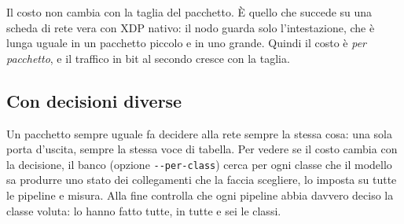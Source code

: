 \documentclass[11pt,a4paper,oneside]{report}
\begin{document}
\begin{center}
\end{center}

Il costo non cambia con la taglia del pacchetto. È quello che succede su una
scheda di rete vera con XDP nativo: il nodo guarda solo l'intestazione, che è
lunga uguale in un pacchetto piccolo e in uno grande. Quindi il costo è
\emph{per pacchetto}, e il traffico in bit al secondo cresce con la taglia.

\subsection*{Con decisioni diverse}

Un pacchetto sempre uguale fa decidere alla rete sempre la stessa cosa: una sola
porta d'uscita, sempre la stessa voce di tabella. Per vedere se il costo cambia
con la decisione, il banco (opzione \texttt{-{}-per-class}) cerca per ogni classe
che il modello sa produrre uno stato dei collegamenti che la faccia scegliere, lo
imposta su tutte le pipeline e misura. Alla fine controlla che ogni pipeline
abbia davvero deciso la classe voluta: lo hanno fatto tutte, in tutte e sei le
classi.
\end{document}
